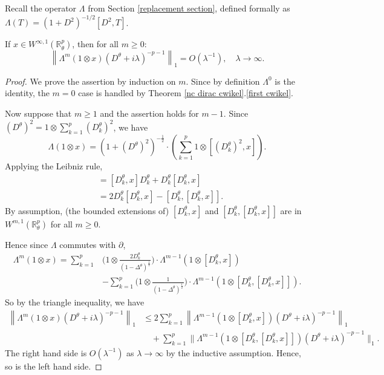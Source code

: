     Recall the operator $\Lambda$ from Section \ref{replacement section}, defined formally as $\Lambda(T) = (1+D^2)^{-1/2}[D^2,T]$.

    \begin{lem}\label{ncplane main assumption for lambda} 
    If $x\in W^{\infty,1}(\mathbb{R}^p_{\theta})$, then for all $m\geq 0$:
        \begin{equation*}
            \left\|\Lambda^m(1\otimes x)(D^\theta+i\lambda)^{-p-1}\right\|_1 = O(\lambda^{-1}),\quad\lambda\to\infty.
        \end{equation*}
    \end{lem}
    \begin{proof}
        We prove the assertion by induction on $m.$ Since by definition $\Lambda^0$ is the identity, the $m=0$ case is handled by Theorem \ref{nc dirac cwikel}.\eqref{first cwikel}.

        Now suppose that $m\geq 1$ and the assertion holds for $m-1.$ 
        Since $(D^\theta)^2 = 1\otimes \sum_{k=1}^p (D_k^\theta)^2$, we have
        \begin{equation*}
            \Lambda(1\otimes x) = (1+(D^\theta)^2)^{-\frac{1}{2}}\cdot(\sum_{k=1}^p1\otimes[(D_k^\theta)^2,x]).
        \end{equation*}
        Applying the Leibniz rule,
        \begin{align*} 
            [(D_k^\theta)^2,x] &= [D_k^\theta,x]D_k^\theta+D_k^\theta[D_k^\theta,x]\\
                               &= 2D_k^\theta[D_k^\theta,x]-[D_k^\theta,[D_k^\theta,x]].
        \end{align*}
        By assumption, (the bounded extensions of) $[D_k^\theta,x]$ and $[D_k^\theta,[D_k^\theta,x]]$ are in $W^{m,1}(\mathbb{R}^p_{\theta})$ for all $m\geq0.$

        Hence since $\Lambda$ commutes with $\partial$,
        \begin{align*}
            \Lambda^m(1\otimes x) = \sum_{k=1}^p&\Big(1\otimes \frac{2D_k^\theta}{(1-\Delta^\theta)^{\frac12}}\Big)\cdot \Lambda^{m-1}(1\otimes [D_k^\theta,x])\\
                                  &-\sum_{k=1}^p\Big(1\otimes\frac1{(1-\Delta^\theta)^{\frac12}}\Big)\cdot \Lambda^{m-1}(1\otimes [D_k^\theta,[D_k^\theta,x]]).
        \end{align*}
        So by the triangle inequality, we have
        \begin{align*}
            \left\|\Lambda^m(1\otimes x)(D^\theta+i\lambda)^{-p-1}\right\|_1 &\leq 2\sum_{k=1}^p\left\|\Lambda^{m-1}(1\otimes [D_k^\theta,x])(D^\theta+i\lambda)^{-p-1}\right\|_1\\
                                                                             &\quad +\sum_{k=1}^p\|\Lambda^{m-1}(1\otimes [D_k^\theta,[D_k^\theta,x]])(D^\theta+i\lambda)^{-p-1}\Big\|_1.
        \end{align*}
        The right hand side is $O(\lambda^{-1})$ as $\lambda\to\infty$ by the inductive assumption. Hence, so is the left hand side.
    \end{proof}

